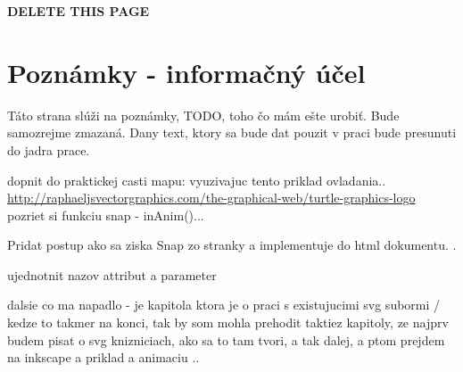 {\Huge\textbf{ DELETE THIS PAGE}}
\section{Poznámky - informačný účel}
Táto strana slúži na poznámky, TODO, toho čo mám ešte urobiť. 
Bude samozrejme zmazaná.  
Dany text, ktory sa bude dat pouzit v praci bude presunuti do jadra prace. 

dopnit do praktickej casti mapu: vyuzivajuc tento priklad ovladania.. \url{http://raphaeljsvectorgraphics.com/the-graphical-web/turtle-graphics-logo}
pozriet si funkciu snap - inAnim()...


Pridat postup ako sa ziska Snap zo stranky a implementuje do html dokumentu. .

ujednotnit nazov attribut a parameter

dalsie co ma napadlo - je kapitola \cite[p.~81]{Dawber} ktora je o praci s existujucimi svg subormi / kedze to takmer na konci, tak by som mohla prehodit taktiez kapitoly, ze najprv budem pisat o svg knizniciach, ako sa to tam tvori, a tak dalej, a ptom prejdem na inkscape a priklad a animaciu .. 

